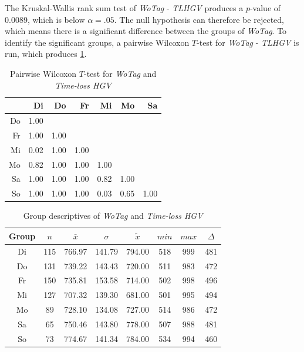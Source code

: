 The Kruskal-Wallis rank sum test of \textit{WoTag} - \textit{TLHGV} produces a $p$-value of 0.0089, which is below $\alpha=.05$. The null hypothesis can therefore be rejected, which means there is a significant difference between the groups of \textit{WoTag}. To identify the significant groups, a pairwise Wilcoxon $T$-test for \textit{WoTag} - \textit{TLHGV} is run, which produces \cref{tbl:wilcoxon_baysis_effector_WoTag_TLHGV}. 
\begin{table}[ht!]
	\tiny
	\centering
    \begin{tabular}{rrrrrrr}
		\toprule
		   & Di & Do & Fr & Mi & Mo & Sa \\ 
		\midrule
		Do & 1.00 &  &  &  &  &  \\ 
		Fr & 1.00 & 1.00 &  &  &  &  \\ 
		Mi & 0.02 & 1.00 & 1.00 &  &  &  \\ 
		Mo & 0.82 & 1.00 & 1.00 & 1.00 &  &  \\ 
		Sa & 1.00 & 1.00 & 1.00 & 0.82 & 1.00 &  \\ 
		So & 1.00 & 1.00 & 1.00 & 0.03 & 0.65 & 1.00 \\ 
		\bottomrule
	\end{tabular}
    \caption{Pairwise Wilcoxon $T$-test for \textit{WoTag} and \textit{Time-loss HGV}}
    \label{tbl:wilcoxon_baysis_effector_WoTag_TLHGV}
\end{table}
\begin{table}[ht!]
	\tiny
	\centering
    \begin{tabular}{c|c|c|c|c|c|c|c}
		\toprule
		Group & $n$ & $\bar{x}$ & $\sigma$ & $\tilde{x}$ & $min$ & $max$ & $\Delta$ \\
		\midrule
		Di & 115 & 766.97 & 141.79 & 794.00 & 518 & 999 & 481 \\ 
		Do & 131 & 739.22 & 143.43 & 720.00 & 511 & 983 & 472 \\ 
		Fr & 150 & 735.81 & 153.58 & 714.00 & 502 & 998 & 496 \\ 
		Mi & 127 & 707.32 & 139.30 & 681.00 & 501 & 995 & 494 \\ 
		Mo & 89  & 728.10 & 134.08 & 727.00 & 514 & 986 & 472 \\ 
		Sa & 65  & 750.46 & 143.80 & 778.00 & 507 & 988 & 481 \\ 
		So & 73  & 774.67 & 141.34 & 784.00 & 534 & 994 & 460 \\ 
		\bottomrule
	\end{tabular}
    \caption{Group descriptives of \textit{WoTag} and \textit{Time-loss HGV}}
    \label{tbl:descriptives_baysis_effector_WoTag_TLHGV}
\end{table}

